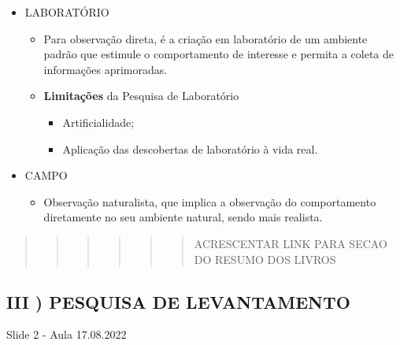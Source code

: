 \documentclass[
]{book}
\providecommand{\tightlist}{%
  \setlength{\itemsep}{0pt}\setlength{\parskip}{0pt}}
\begin{document}
\begin{itemize}
\tightlist
\item
  LABORATÓRIO

  \begin{itemize}
  \tightlist
  \item
    Para observação direta, é a criação em laboratório de um ambiente padrão que estimule o comportamento de interesse e permita a coleta de informações aprimoradas.
  \item
    \textbf{Limitações} da Pesquisa de Laboratório

    \begin{itemize}
    \tightlist
    \item
      Artificialidade;
    \item
      Aplicação das descobertas de laboratório à vida real.
    \end{itemize}
  \end{itemize}
\item
  CAMPO

  \begin{itemize}
  \tightlist
  \item
    Observação naturalista, que implica a observação do comportamento diretamente no seu ambiente natural, sendo mais realista.
  \end{itemize}
\end{itemize}

\begin{quote}
\begin{quote}
\begin{quote}
\begin{quote}
\begin{quote}
\begin{quote}
ACRESCENTAR LINK PARA SECAO DO RESUMO DOS LIVROS
\end{quote}
\end{quote}
\end{quote}
\end{quote}
\end{quote}
\end{quote}

\hypertarget{iii-pesquisa-de-levantamento}{%
\subsection{III ) PESQUISA DE LEVANTAMENTO}\label{iii-pesquisa-de-levantamento}}

Slide 2 - Aula 17.08.2022
\end{document}
